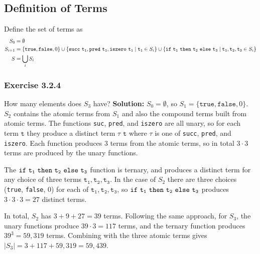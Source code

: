

\titlespacing{\subsubsection}{0pt}{\parskip}{-\parskip}



\subsection*{Definition of Terms}
Define the set of terms as 
\begin{align*}
    S_0 &= \emptyset \\
    S_{i+1} &= \{\mathtt{true}, \mathtt{false}, 0\} 
    \cup \{\mathtt{succ}\,\,\mathtt{t_1}, \mathtt{pred}\,\,\mathtt{t_1}, \mathtt{iszero}\,\,\mathtt{t_1}\mid\mathtt{t_1} \in S_i\} 
    \cup \{\mathtt{if}\,\,\mathtt{t_1}\,\,\mathtt{then}\,\,\mathtt{t_2}\,\,\mathtt{else}\,\,\mathtt{t_3}\mid\mathtt{t_1}, \mathtt{t_2}, \mathtt{t_3} \in S_i\} \\
    S &= \bigcup_i S_i
\end{align*}
\subsubsection*{Exercise 3.2.4}
How many elements does $S_3$ have?
\newline
\textbf{Solution:} $S_0 = \emptyset$, so $S_1 = \{\mathtt{true}, \mathtt{false}, 0\}$.  $S_2$ contains
the atomic terms from $S_1$ and also the compound terms built from atomic terms. The functions \texttt{suc},
\texttt{pred}, and \texttt{iszero} are all unary, so for each term $\mathtt{t}$ they produce a distinct
term $\tau\,\, \mathtt{t}$ where $\tau$ is one of \texttt{succ}, \texttt{pred}, and \texttt{iszero}.  Each function produces $3$ terms from the atomic terms, so in total $3 \cdot 3$ terms are produced by the unary functions.

The $\mathtt{if}\,\,\mathtt{t_1}\,\,\mathtt{then}\,\,\mathtt{t_2}\,\,\mathtt{else}\,\,\mathtt{t_3}$ function is ternary, and produces a distinct term for any choice of 
three terms $\mathtt{t_1}, \mathtt{t_2}, \mathtt{t_3}$. 
In the case of $S_2$ there are three choices (\texttt{true}, \texttt{false}, $0$) for each of
$\mathtt{t_1}, \mathtt{t_2}, \mathtt{t_3}$, so $\mathtt{if}\,\,\mathtt{t_1}\,\,\mathtt{then}\,\,\mathtt{t_2}\,\,\mathtt{else}\,\,\mathtt{t_3}$ produces $3 \cdot 3 \cdot 3 = 27$ distinct terms.  

In total, $S_2$ has $3 + 9 + 27 = 39$ terms.  Following the same approach, for $S_3$, the unary functions
produce $39 \cdot 3 = 117$ terms, and the ternary function produces $39^3 = 59,319$ terms.  Combining with
the three atomic terms gives $|S_3| = 3 + 117 + 59,319 = 59,439$.

